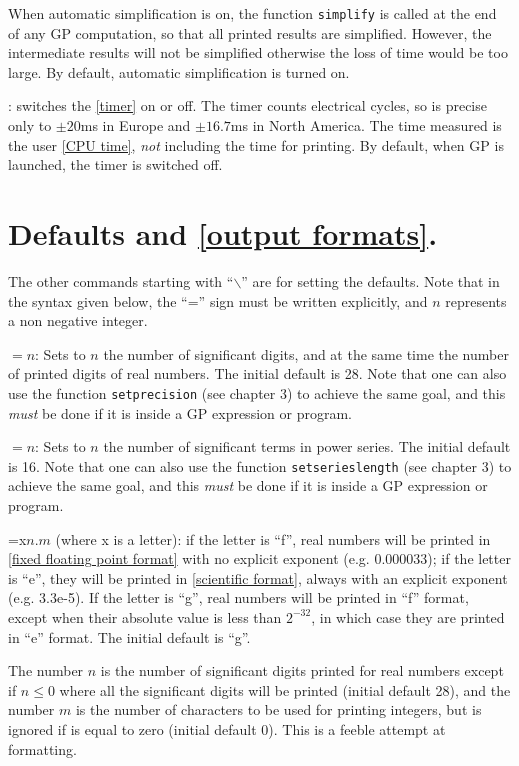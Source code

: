 When automatic simplification is on, the function {\tt simplify} is called
at the end of any GP computation, so that all printed results are simplified.
However, the intermediate results will not be simplified otherwise the loss
of time would be too large. By default, automatic simplification is turned
on. 

\subsec{\#}: switches the \ref{timer} on or off. The timer counts electrical
cycles, so is precise only to $\pm20$ms in Europe and $\pm16.7$ms in North 
America. The time measured is the user \ref{CPU time}, {\it not} including the
time for printing. By default, when GP is launched, the timer is switched off.

\section{Defaults and \ref{output formats}.}

The other commands starting with ``$\backslash$'' are for setting the
defaults.
Note that in the syntax given below, the ``='' sign must be written
explicitly, and $n$ represents a non negative integer.

\subsec{$\backslash$\ref{precision}}$=n$:
Sets to $n$ the number of significant digits, and at the same time the
number of printed digits of real numbers. The initial default is 28.
Note that one can also use the function {\tt setprecision} (see chapter 3)
to achieve the same goal, and this {\sl must} be done if it is inside a
GP expression or program.

\subsec{$\backslash$\ref{serieslength}}$=n$:
Sets to $n$ the number of significant terms in power series. The initial
default is 16. Note that one can also use the function {\tt setserieslength}
(see chapter 3) to achieve the same goal, and this {\sl must} be done if it 
is inside a GP expression or program.

\subsec{$\backslash$\ref{format}}=x$n.m$ (where x is a letter): if the letter
is ``f'', real
numbers will be printed in \ref{fixed floating point format} with no explicit
exponent (e.g. 0.000033); if the letter is ``e'', they will be printed
in \ref{scientific format}, always with an explicit exponent (e.g. 3.3e-5).
If the letter is ``g'', real numbers will be printed in ``f'' format,
except when their absolute value is less than $2^{-32}$, in which case
they are printed in ``e'' format. The initial default is ``g''.

The number $n$ is the number of significant digits printed for real numbers
except if $n\le0$ where all the significant digits will be printed
(initial default 28), and the number $m$ is the number of characters to be
used for printing integers, but is ignored if is equal to zero (initial
default 0). This is a feeble attempt at formatting.

